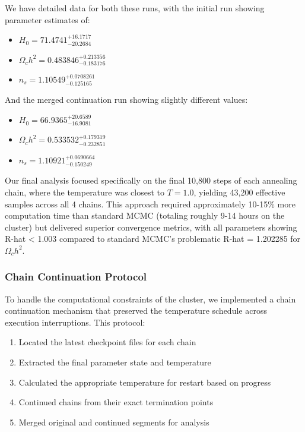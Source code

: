 \documentclass[11pt]{article}
\theoremstyle{definition}
\begin{document}
We have detailed data for both these runs, with the initial run showing parameter estimates of:
\begin{itemize}
    \item $H_0 = 71.4741^{+16.1717}_{-20.2684}$
    \item $\Omega_c h^2 = 0.483846^{+0.213356}_{-0.183176}$
    \item $n_s = 1.10549^{+0.0708261}_{-0.125165}$
\end{itemize}

And the merged continuation run showing slightly different values:
\begin{itemize}
    \item $H_0 = 66.9365^{+20.6589}_{-16.9081}$
    \item $\Omega_c h^2 = 0.533532^{+0.179319}_{-0.232851}$
    \item $n_s = 1.10921^{+0.0690664}_{-0.150249}$
\end{itemize}

Our final analysis focused specifically on the final 10,800 steps of each annealing chain, where the temperature was closest to $T=1.0$, yielding 43,200 effective samples across all 4 chains. This approach required approximately 10-15\% more computation time than standard MCMC (totaling roughly 9-14 hours on the cluster) but delivered superior convergence metrics, with all parameters showing R-hat < 1.003 compared to standard MCMC's problematic R-hat = 1.202285 for $\Omega_c h^2$.

\subsubsection{Chain Continuation Protocol}

To handle the computational constraints of the cluster, we implemented a chain continuation mechanism that preserved the temperature schedule across execution interruptions. This protocol:

\begin{enumerate}
    \item Located the latest checkpoint files for each chain
    \item Extracted the final parameter state and temperature
    \item Calculated the appropriate temperature for restart based on progress
    \item Continued chains from their exact termination points
    \item Merged original and continued segments for analysis
\end{enumerate}
\end{document}
